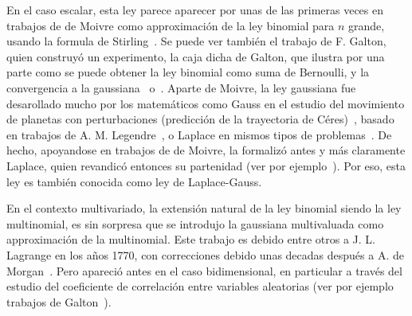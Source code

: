 \label{Sssec:MP:Gaussiana}

En el caso escalar,  esta ley parece aparecer por unas de  las primeras veces en
trabajos de de  Moivre como approximaci\'on de la ley  binomial para $n$ grande,
usando la formula de Stirling~\cite{Moi30, Moi33, Moi56, Pea24, PeaMoi26, Dem33,
  Hal84,  Hal90,  JohKot95:v1, DavEdw01,  Hal06}.   Se  puede  ver tambi\'en  el
trabajo  de F.   Galton,  quien construy\'o  un  experimento, la  caja dicha  de
Galton, que  ilustra por una  parte como se  puede obtener la ley  binomial como
suma   de  Bernoulli,   y   la  convergencia   a  la   gaussiana~\cite[Figs.~7-9,
p.~63]{Gal89}  o~\cite[p.~38]{Pea20}.  Aparte  de  Moivre, la  ley gaussiana  fue
desarollado mucho por los matem\'aticos  como Gauss en el estudio del movimiento
de   planetas   con   perturbaciones   (predicci\'on  de   la   trayectoria   de
C\'eres)~\cite{Gau09,  Pea24, DavEdw01,  Hal06}, basado  en trabajos  de  A.  M.
Legendre~\cite{Leg05,   DavEdw01,  Hal06},   o  Laplace   en  mismos   tipos  de
problemas~\cite{Lap09, Lap09:Supp, Lap12, Lap14, Lap20, Pea24, DavEdw01, Hal06}.
De hecho,  apoyandose en  trabajos de  de Moivre, la  formaliz\'o antes  y m\'as
claramente  Laplace,   quien  revandic\'o   entonces  su  partenidad   (ver  por
ejemplo~\cite{Pea20}).   Por eso,  esta ley  es tambi\'en  conocida como  ley de
Laplace-Gauss.

En el contexto multivariado, la extensi\'on natural de la ley binomial siendo la
ley multinomial, es sin sorpresa  que se introdujo la gaussiana multivaluada como
approximaci\'on de la multinomial.  Este trabajo  es debido entre otros a J.  L.
Lagrange en  los a\~nos 1770, con  correcciones debido unas  decadas despu\'es a
A. de  Morgan~\cite{Mor38}. Pero apareci\'o  antes en el caso  bidimensional, en
particular  a  trav\'es  del  estudio  del coeficiente  de  correlaci\'on  entre
variables   aleatorias  (ver   por  ejemplo   trabajos   de  Galton~\cite{Gal77,
  Gal77:Nature, Pea20}).

